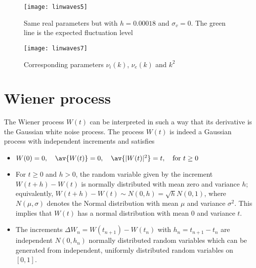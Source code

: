 \documentclass[10pt,a4paper]{article}
\newcommand{\eq}[1]{Eq.~(#1)}
\newcommand{\eqs}[1]{Eqs.~(#1)}
\newcommand{\fig}[1]{Fig.~#1}
\begin{document}
\begin{figure}
\centering\texttt{[image: linwaves5]}
\caption{Same real parameters but with $h=0.00018$ and $\sigma_v=0$. 
The green line is the expected fluctuation level }
\label{fig:linwaves5}
\end{figure}




\begin{figure}
\centering\texttt{[image: linwaves7]}
\caption{Corresponding parameters $\nu_i(k)$, $\nu_e(k)$ and $k^2$ }
\label{fig:linwaves7}
\end{figure}




\appendix

\section{Wiener process}

The Wiener process $W(t)$ can be interpreted in such a way that its derivative is the
Gaussian white noise process. The process $W(t)$ is indeed a Gaussian process with
independent increments and satisfies \citep{oksendal:2000,higham:2001}
\begin{itemize}
\item $W(0)=0, \quad \av{W(t)}=0, \quad  \av{|W(t)|^2}=t, \quad\mbox{for }  t\geq0$
\item For $t\geq0$ and $h>0$, the random variable given by the increment
$W(t+h)-W(t)$ is normally distributed with mean zero and variance $h$; equivalently,
$W(t+h)-W(t) \sim N(0,h) = \sqrt{h} N(0,1)$, where $N(\mu,\sigma)$ denotes the Normal
distribution with mean $\mu$ and variance $\sigma^2$. This implies that $W(t)$ has a normal
distribution with mean 0 and variance $t$.
\item The increments $\Delta W_n=W(t_{n+1})-W(t_n)$ with $h_n=t_{n+1}-t_{n}$ are
independent $N(0,h_n)$ normally distributed random variables which can be generated from
independent, uniformly distributed random variables on $[0, 1]$.
\end{itemize}
\end{document}
